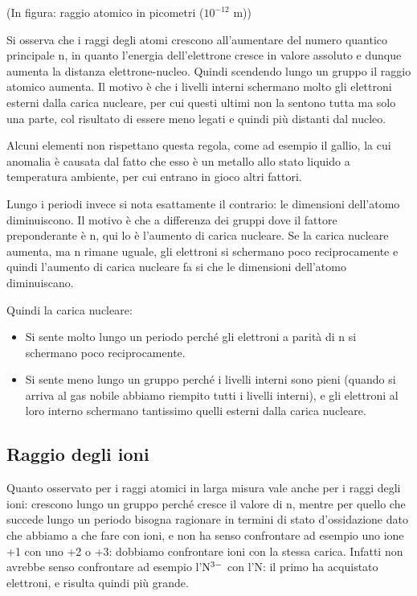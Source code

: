 (In figura: raggio atomico in picometri ($10^{-12}$ m))

Si osserva che i raggi degli atomi crescono all'aumentare del numero quantico principale n, in quanto l'energia dell'elettrone cresce in valore assoluto e dunque aumenta la distanza elettrone-nucleo. Quindi scendendo lungo un gruppo il raggio atomico aumenta. Il motivo è che i livelli interni schermano molto gli elettroni esterni dalla carica nucleare, per cui questi ultimi non la sentono tutta ma solo una parte, col risultato di essere meno legati e quindi più distanti dal nucleo.

Alcuni elementi non rispettano questa regola, come ad esempio il gallio, la cui anomalia è causata dal fatto che esso è un metallo allo stato liquido a temperatura ambiente, per cui entrano in gioco altri fattori.

Lungo i periodi invece si nota esattamente il contrario: le dimensioni dell'atomo diminuiscono. Il motivo è che a differenza dei gruppi dove il fattore preponderante è n, qui lo è l'aumento di carica nucleare. Se la carica nucleare aumenta, ma n rimane uguale, gli elettroni si schermano poco reciprocamente e quindi l'aumento di carica nucleare fa si che le dimensioni dell'atomo diminuiscano.

Quindi la carica nucleare:
\begin{itemize}
    \item Si sente molto lungo un periodo perché gli elettroni a parità di n si schermano poco reciprocamente.
    \item Si sente meno lungo un gruppo perché i livelli interni sono pieni (quando si arriva al gas nobile abbiamo riempito tutti i livelli interni), e gli elettroni al loro interno schermano tantissimo quelli esterni dalla carica nucleare.
\end{itemize}
\subsection{Raggio degli ioni}
Quanto osservato per i raggi atomici in larga misura vale anche per i raggi degli ioni: crescono lungo un gruppo perché cresce il valore di n, mentre per quello che succede lungo un periodo bisogna ragionare in termini di stato d'ossidazione dato che abbiamo a che fare con ioni, e non ha senso confrontare ad esempio uno ione +1 con uno +2 o +3: dobbiamo confrontare ioni con la stessa carica. Infatti non avrebbe senso confrontare ad esempio l'$\rm N^{3-}$ con l'N: il primo ha acquistato elettroni, e risulta quindi più grande.

